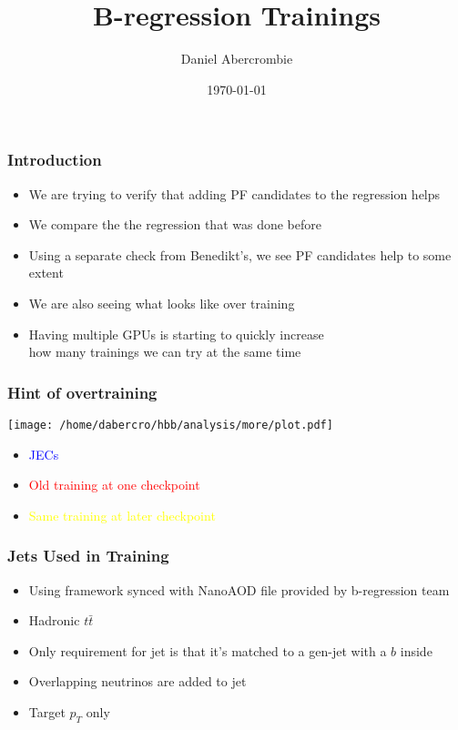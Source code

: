 \documentclass{beamer}
\author[D. Abercrombie]{
  Daniel Abercrombie
}
\title{\bf \sffamily B-regression Trainings}
\date{\today}
\begin{document}
\begin{frame}
  \titlepage
\end{frame}

\begin{frame}
  \frametitle{Introduction}

  \begin{itemize}
  \item We are trying to verify that adding PF candidates to the regression helps
  \item We compare the the regression that was done before
  \item Using a separate check from Benedikt's, we see PF candidates help to some extent
  \item We are also seeing what looks like over training
  \item Having multiple GPUs is starting to quickly increase \\
    how many trainings we can try at the same time
  \end{itemize}

\end{frame}

\begin{frame}
  \frametitle{Hint of overtraining}

  \begin{center}
  \texttt{[image: /home/dabercro/hbb/analysis/more/plot.pdf]}
  \end{center}

  \begin{itemize}
  \item \textcolor{blue}{JECs}
  \item \textcolor{red}{Old training at one checkpoint}
  \item \textcolor{yellow}{Same training at later checkpoint}
  \end{itemize}

\end{frame}

\begin{frame}
  \frametitle{Jets Used in Training}

  \begin{itemize}
  \item Using framework synced with NanoAOD file provided by b-regression team
  \item Hadronic $t\bar{t}$
  \item Only requirement for jet is that it's matched to a gen-jet with a $b$ inside
  \item Overlapping neutrinos are added to jet
  \item Target $p_T$ only
  \end{itemize}

\end{frame}
\end{document}
